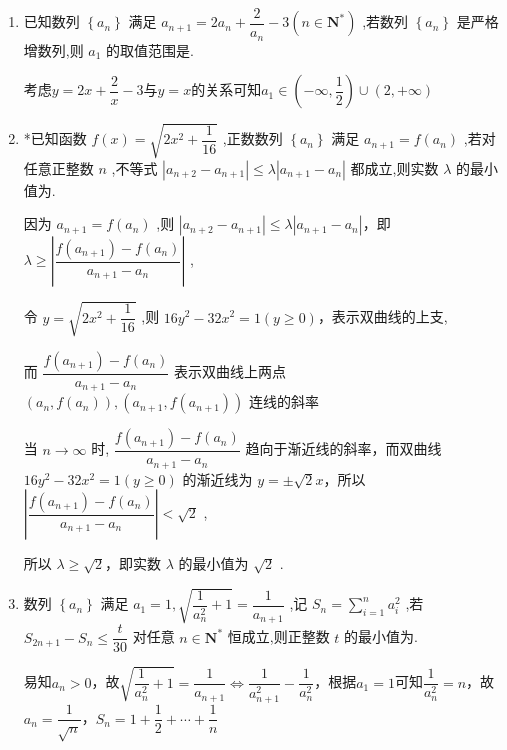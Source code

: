 \begin{enumerate}
    \item 已知数列 $\left\{  {a}_{n}\right\}$ 满足 ${a}_{n + 1} = 2{a}_{n} + \dfrac{2}{{a}_{n}} - 3\left( {n \in  {\mathbf{N}}^{ * }}\right)$ ,若数列 $\left\{  {a}_{n}\right\}$ 是严格增数列,则 ${a}_{1}$ 的取值范围是.
    \begin{jieda}
        考虑$y = 2x+\dfrac{2}{x} - 3$与$y = x$的关系可知$a_1 \in \left(-\infty, \dfrac{1}{2}\right) \cup (2, +\infty)$
    \end{jieda}
    
    \item *已知函数 $f\left( x\right)  = \sqrt{2{x}^{2} + \dfrac{1}{16}}$ ,正数数列 $\left\{  {a}_{n}\right\}$ 满足 ${a}_{n + 1} = f\left( {a}_{n}\right)$ ,若对任意正整数 $n$ ,不等式 $\left| {{a}_{n + 2} - {a}_{n + 1}}\right|  \leq  \lambda \left| {{a}_{n + 1} - {a}_{n}}\right|$ 都成立,则实数 $\lambda$ 的最小值为.
    \begin{jieda}
        因为 ${a}_{n + 1} = f\left( {a}_{n}\right)$ ,则 $\left| {{a}_{n + 2} - {a}_{n + 1}}\right|  \leq  \lambda \left| {{a}_{n + 1} - {a}_{n}}\right|$，即 $\lambda  \geq  \left| \dfrac{f\left( {a}_{n + 1}\right)  - f\left( {a}_{n}\right) }{{a}_{n + 1} - {a}_{n}}\right|$ ,
        
        令 $y = \sqrt{2{x}^{2} + \dfrac{1}{16}}$ ,则 ${16}{y}^{2} - {32}{x}^{2} = 1\left( {y \geq  0}\right)$，表示双曲线的上支,
        
        而 $\dfrac{f\left( {a}_{n + 1}\right)  - f\left( {a}_{n}\right) }{{a}_{n + 1} - {a}_{n}}$ 表示双曲线上两点 $\left( {{a}_{n},f\left( {a}_{n}\right) }\right) ,\left( {{a}_{n + 1},f\left( {a}_{n + 1}\right) }\right)$ 连线的斜率
        
        当 $n \rightarrow  \infty$ 时, $\dfrac{f\left( {a}_{n + 1}\right)  - f\left( {a}_{n}\right) }{{a}_{n + 1} - {a}_{n}}$ 趋向于渐近线的斜率，而双曲线 ${16y^2} - {32x^2} = 1\left( {y \geq  0}\right)$ 的渐近线为 $y =  \pm  \sqrt{2}x$，所以 $\left| \dfrac{f\left( {a}_{n + 1}\right)  - f\left( {a}_{n}\right) }{{a}_{n + 1} - {a}_{n}}\right|  < \sqrt{2}$ ,
        
        所以 $\lambda  \geq  \sqrt{2}$，即实数 $\lambda$ 的最小值为 $\sqrt{2}$ .
    \end{jieda}
    
    \item 数列 $\left\{  {a}_{n}\right\}$ 满足 ${a}_{1} = 1,\sqrt{\dfrac{1}{{a}_{n}^{2}} + 1} = \dfrac{1}{{a}_{n + 1}}$ ,记 ${S}_{n} = \mathop{\sum }\limits_{{i = 1}}^{n}{a}_{i}^{2}$ ,若 ${S}_{{2n} + 1} - {S}_{n} \leq  \dfrac{t}{30}$ 对任意 $n \in  {\mathbf{N}}^{ * }$ 恒成立,则正整数 $t$ 的最小值为.
    \begin{jieda}
        易知$a_n > 0$，故$\sqrt{\dfrac{1}{{a}_{n}^{2}} + 1} = \dfrac{1}{{a}_{n + 1}} \Longleftrightarrow \dfrac{1}{a_{n+1}^2} - \dfrac{1}{a_n^2}$，根据$a_1 = 1$可知$\dfrac{1}{a_n^2} = n$，故$a_n = \dfrac{1}{\sqrt{n}}$，$S_n = 1 + \dfrac{1}{2} + \cdots + \dfrac{1}{n}$


\end{jieda}
\end{enumerate}
